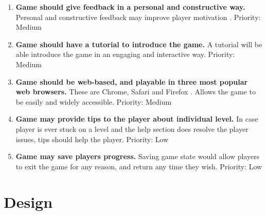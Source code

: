 \documentclass[a4paper,11.5pt]{report}
\numberwithin{figure}{section}
\numberwithin{table}{section}
\numberwithin{equation}{section}
\numberwithin{equation}{section}
\newcommand\blankpage{%
    \null
    \thispagestyle{empty}%
    \addtocounter{page}{-1}%
    \newpage}
\begin{document}
\begin{enumerate}[label=3.2.\arabic*]
  \item \textbf{Game should give feedback in a personal and constructive way.} Personal and constructive feedback may improve player motivation \citep{lee2011}. \newline Priority: Medium
  
  \item \textbf{Game should have a tutorial to introduce the game.} A tutorial will be able introduce the game in an engaging and interactive way. \newline Priority: Medium
  
  \item \textbf{Game should be web-based, and playable in three most popular web browsers.} These are Chrome, Safari and Firefox \citep{statistabrowser}. Allows the game to be easily and widely accessible. \newline Priority: Medium
  
  \item \textbf{Game may provide tips to the player about individual level.} In case player is ever stuck on a level and the help section does resolve the player issues, tips should help the player. \newline Priority: Low 
  
  \item \textbf{Game may save players progress.} Saving game state would allow players to exit the game for any reason, and return any time they wish. \newline Priority: Low
  
\end{enumerate}


\afterpage{\blankpage}






\chapter{Design}

\end{document}
